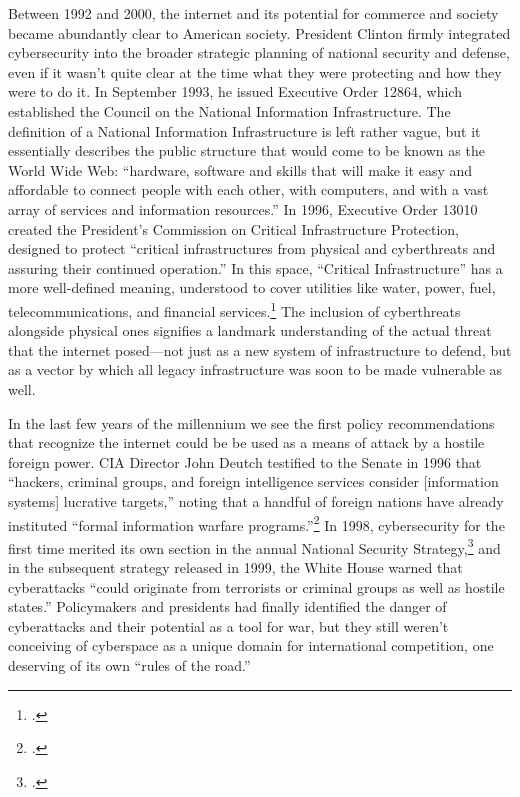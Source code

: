 \documentclass{report}
\begin{document}
\begin{refsegment}
Between 1992 and 2000, the internet and its potential for commerce and society became abundantly clear to American society. President Clinton firmly integrated cybersecurity into the broader strategic planning of national security and defense, even if it wasn't quite clear at the time what they were protecting and how they were to do it. In September 1993, he issued Executive Order 12864, which established the Council on the National Information Infrastructure. The definition of a National Information Infrastructure is left rather vague, but it essentially describes the public structure that would come to be known as the World Wide Web: ``hardware, software and skills that will make it easy and affordable to connect people with each other, with computers, and with a vast array of services and information resources.'' In 1996, Executive Order 13010 created the President's Commission on Critical Infrastructure Protection, designed to protect ``critical infrastructures from physical and cyberthreats and assuring their continued operation.'' In this space, ``Critical Infrastructure'' has a more well-defined meaning, understood to cover utilities like water, power, fuel, telecommunications, and financial services.\footcite[~p.761. Completely omitted from this thesis is the concurrent debate about the role the government should play in regulating encryption technology. At the same time it was drafting the Executive Orders mentioned above, the Clinton administration was also taking executive action to manage encryption. The encryption debate (which is still ongoing today) raises a lot of questions about the relationship between the federal government, civil liberties, and law enforcement, as well as more generic national security concerns. It is however mostly irrelevant the specific international political questions that motivate this inquriy, and as such is not included here.]{boys_clinton_2018} The inclusion of cyberthreats alongside physical ones signifies a landmark understanding of the actual threat that the internet posed---not just as a new system of infrastructure to defend, but as a vector by which all legacy infrastructure was soon to be made vulnerable as well.

In the last few years of the millennium we see the first policy recommendations that recognize the internet could be be used as a means of attack by a hostile foreign power. CIA Director John Deutch testified to the Senate in 1996 that ``hackers, criminal groups, and foreign intelligence services consider [information systems] lucrative targets,'' noting that a handful of foreign nations have already instituted ``formal information warfare programs.''\footcite{deutch_worldwide_1996} In 1998, cybersecurity for the first time merited its own section in the annual National Security Strategy,\footcite[~p.761]{boys_clinton_2018} and in the subsequent strategy released in 1999, the White House warned that cyberattacks ``could originate from terrorists or criminal groups as well as hostile states.'' Policymakers and presidents had finally identified the danger of cyberattacks and their potential as a tool for war, but they still weren't conceiving of cyberspace as a unique domain for international competition, one deserving of its own ``rules of the road.''



\end{refsegment}
\end{document}
